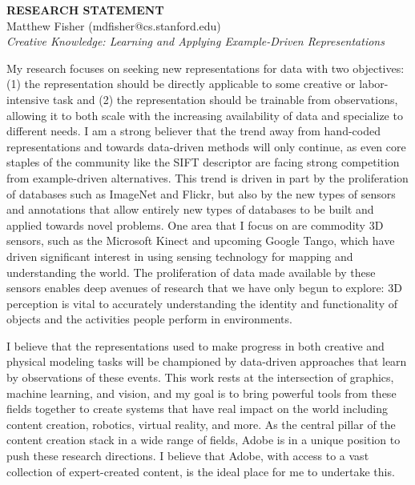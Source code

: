 \documentclass[12pt, a4paper]{article}
\begin{document}
\begin{small}

\begin{center}
{\LARGE \bf RESEARCH STATEMENT}\\
\vspace*{0.1cm}
{\normalsize Matthew Fisher (mdfisher@cs.stanford.edu)}\\
\vspace*{0.25cm}
{\large\textit{Creative Knowledge: Learning and Applying Example-Driven Representations}}
\end{center}



My research focuses on seeking new representations for data with two objectives: (1) the representation should be directly applicable to some creative or labor-intensive task and (2) the representation should be trainable from observations, allowing it to both scale with the increasing availability of data and specialize to different needs. I am a strong believer that the trend away from hand-coded representations and towards data-driven methods will only continue, as even core staples of the community like the SIFT descriptor are facing strong competition from example-driven alternatives. This trend is driven in part by the proliferation of databases such as ImageNet and Flickr, but also by the new types of sensors and annotations that allow entirely new types of databases to be built and applied towards novel problems. One area that I focus on are commodity 3D sensors, such as the Microsoft Kinect and upcoming Google Tango, which have driven significant interest in using sensing technology for mapping and understanding the world. The proliferation of data made available by these sensors enables deep avenues of research that we have only begun to explore: 3D perception is vital to accurately understanding the identity and functionality of objects and the activities people perform in environments.

I believe that the representations used to make progress in both creative and physical modeling tasks will be championed by data-driven approaches that learn by observations of these events. This work rests at the intersection of graphics, machine learning, and vision, and my goal is to bring powerful tools from these fields together to create systems that have real impact on the world including content creation, robotics, virtual reality, and more. As the central pillar of the content creation stack in a wide range of fields, Adobe is in a unique position to push these research directions. I believe that Adobe, with access to a vast collection of expert-created content, is the ideal place for me to undertake this.


\end{small}
\end{document}
